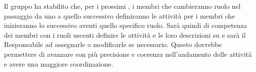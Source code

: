 Il gruppo ha stabilito che, per i prossimi , i membri che cambieranno ruolo nel passaggio da uno  a quello successivo definiranno le attività per i membri che inizieranno lo  successivo aventi quello specifico ruolo. Sarà quindi di competenza dei membri con i ruoli uscenti definire le attività e le loro descrizioni su  e sarà il Responsabile ad assegnarle o modificarle se necessario. Questo dovrebbe permettere di avanzare con più precisione e coerenza nell'andamento delle attività e avere una maggiore coordinazione. 
